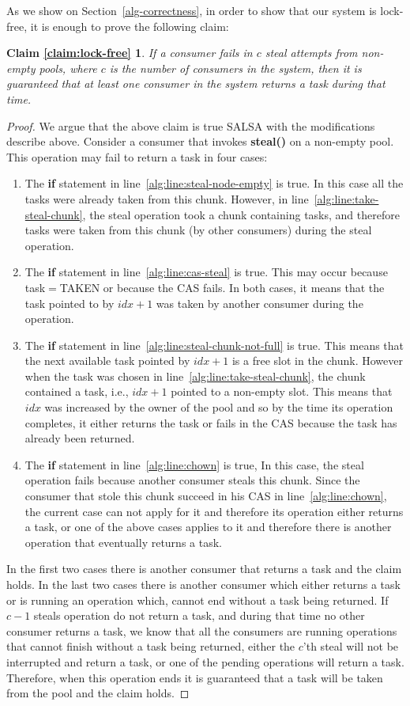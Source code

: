 As we show on Section~\ref{alg-correctness}, in order to show that our system is lock-free, it is enough to prove the following claim:

\newtheorem*{claim:lock-free}{Claim \ref{claim:lock-free}}
\begin{claim:lock-free}
If a consumer fails in $c$ steal attempts from non-empty pools, where $c$ is the number of consumers in the system, then it is guaranteed that at least one consumer in the system returns a task during that time. 
\end{claim:lock-free}
\begin{proof}
We argue that the above claim is true SALSA with the modifications describe above. Consider a consumer that invokes {\bf steal()} on a non-empty pool. This operation may fail to return a task in four cases:
\begin{enumerate}
 \item The {\bf if} statement in line~\ref{alg:line:steal-node-empty} is true. In this case all the tasks were already taken from this chunk. However, in line~\ref{alg:line:take-steal-chunk}, the steal operation took a chunk containing tasks, and therefore tasks were taken from this chunk (by other consumers) during the steal operation.
 \item The {\bf if} statement in line~\ref{alg:line:cas-steal} is true. This may occur because task$=$TAKEN or because the CAS fails. In both cases, it means that the task pointed to by $idx+1$ was taken by another consumer during the operation.
 \item The {\bf if} statement in line~\ref{alg:line:steal-chunk-not-full} is true. This means that the next available task pointed by $idx+1$ is a free slot in the chunk. However when the task was chosen in line~\ref{alg:line:take-steal-chunk}, the chunk contained a task, i.e., $idx+1$ pointed to a non-empty slot. This means that $idx$ was increased by the owner of the pool and so by the time its operation completes, it either returns the task or fails in the CAS because the task has already been returned.
 \item The {\bf if} statement in line~\ref{alg:line:chown} is true, In this case, the steal operation fails because another consumer steals this chunk. Since the consumer that stole this chunk succeed in his CAS in line~\ref{alg:line:chown}, the current case can not apply for it and therefore its operation either returns a task, or one of the above cases applies to it and therefore there is another operation that eventually returns a task. 
\end{enumerate}
In the first two cases there is another consumer that returns a task and the claim holds. In the last two cases there is another consumer which either returns a task or is running an operation which, cannot end without a task being returned. If $c-1$ steals operation do not return a task, and during that time no other consumer returns a task, we know that all the consumers are running operations that cannot finish without a task being returned, either the $c$'th steal will not be interrupted and return a task, or one of the pending operations will return a task. Therefore, when this operation ends it is guaranteed that a task will be taken from the pool and the claim holds.
\end{proof}